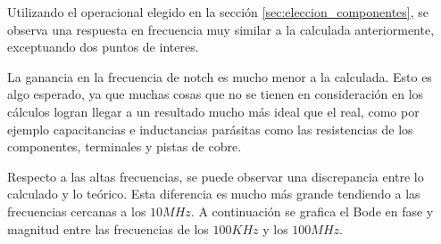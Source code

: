 Utilizando el operacional elegido en la sección \ref{sec:eleccion_componentes}, se observa una respuesta en frecuencia muy similar a la calculada anteriormente, exceptuando dos puntos de interes.

La ganancia en la frecuencia de notch es mucho menor a la calculada. Esto es algo esperado, ya que muchas cosas que no se tienen en consideración en los cálculos logran llegar a un resultado mucho más ideal que el real, como por ejemplo capacitancias e inductancias parásitas como las resistencias de los componentes, terminales y pistas de cobre.

Respecto a las altas frecuencias, se puede observar una discrepancia entre lo calculado y lo teórico. Esta diferencia es mucho más grande tendiendo a las frecuencias cercanas a los $10MHz$. A continuación se grafica el Bode en fase y magnitud entre las frecuencias de los $100KHz$ y los $100MHz$.

